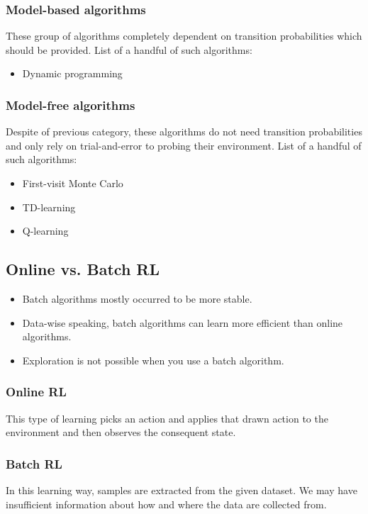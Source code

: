 \documentclass[a4paper,12pt]{article}
\begin{document}
\subsubsection{Model-based algorithms}
These group of algorithms completely dependent on transition probabilities which should be provided. List of a handful of such algorithms:
\begin{itemize}
    \item Dynamic programming
\end{itemize}

\subsubsection{Model-free algorithms}
Despite of previous category, these algorithms do not need transition probabilities and only rely on trial-and-error to probing their environment. List of a handful of such algorithms:
\begin{itemize}
    \item First-visit Monte Carlo
    \item TD-learning
    \item Q-learning
\end{itemize}

\subsection{Online vs. Batch RL}
\begin{itemize}
    \item Batch algorithms mostly occurred to be more stable.
    \item Data-wise speaking, batch algorithms can learn more efficient than online algorithms.
    \item Exploration is not possible when you use a batch algorithm.
\end{itemize}

\subsubsection{Online RL}
This type of learning picks an action and applies that drawn action to the environment and then observes the consequent state.

\subsubsection{Batch RL}
In this learning way, samples are extracted from the given dataset. We may have insufficient information about how and where the data are collected from.
\end{document}
